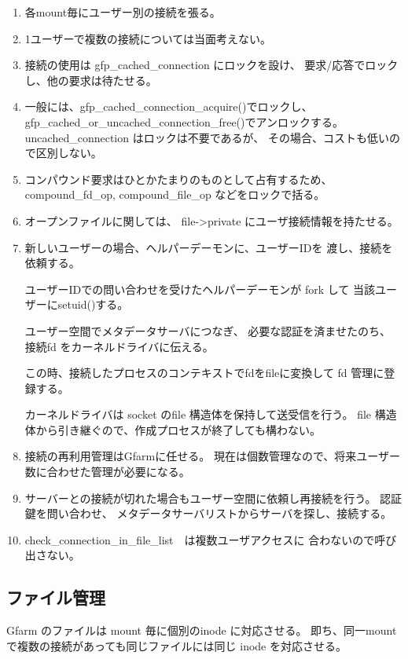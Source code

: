 	\begin{enumerate}
	\item	各mount毎にユーザー別の接続を張る。
	\item	1ユーザーで複数の接続については当面考えない。
	\item	接続の使用は gfp_cached_connection にロックを設け、
		要求/応答でロックし、他の要求は待たせる。
	\item	一般には、gfp_cached_connection_acquire()でロックし、
		gfp_cached_or_uncached_connection_free()でアンロックする。
		uncached_connection はロックは不要であるが、
		その場合、コストも低いので区別しない。
	\item	コンパウンド要求はひとかたまりのものとして占有するため、
		compound_fd_op, compound_file_op などをロックで括る。
	\item	オープンファイルに関しては、
		file->private にユーザ接続情報を持たせる。
	\item	新しいユーザーの場合、ヘルパーデーモンに、ユーザーIDを
		渡し、接続を依頼する。

		ユーザーIDでの問い合わせを受けたヘルパーデーモンが
		fork して 当該ユーザーにsetuid()する。

		ユーザー空間でメタデータサーバにつなぎ、
		必要な認証を済ませたのち、
		接続fd をカーネルドライバに伝える。

		この時、接続したプロセスのコンテキストでfdをfileに変換して
		fd 管理に登録する。
	
		カーネルドライバは socket のfile 構造体を保持して送受信を行う。
		file 構造体から引き継ぐので、作成プロセスが終了しても構わない。

	\item	接続の再利用管理はGfarmに任せる。
		現在は個数管理なので、将来ユーザー数に合わせた管理が必要になる。

	\item	サーバーとの接続が切れた場合もユーザー空間に依頼し再接続を行う。
		認証鍵を問い合わせ、
		メタデータサーバリストからサーバを探し、接続する。

	\item	check_connection_in_file_list　は複数ユーザアクセスに
		合わないので呼び出さない。
	\end{enumerate}

\subsection{ファイル管理}
	Gfarm のファイルは mount 毎に個別のinode に対応させる。
	即ち、同一mount で複数の接続があっても同じファイルには同じ inode 
	を対応させる。

